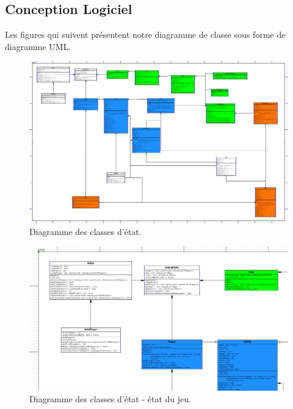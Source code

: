 \subsection{Conception Logiciel}

Les figures qui suivent présentent notre diagramme de classe sous forme de diagramme UML.


\begin{landscape}
\begin{figure}[p]
\includegraphics[width=0.8\paperheight]{images/state.png}
\caption{\label{uml:state}Diagramme des classes d'état.}
\end{figure}
\end{landscape}

\begin{landscape}
\begin{figure}[p]
\includegraphics[width=0.8\paperheight]{images/state1.png}
\caption{\label{uml:state}Diagramme des classes d'état - état du jeu.}
\end{figure}
\end{landscape}

